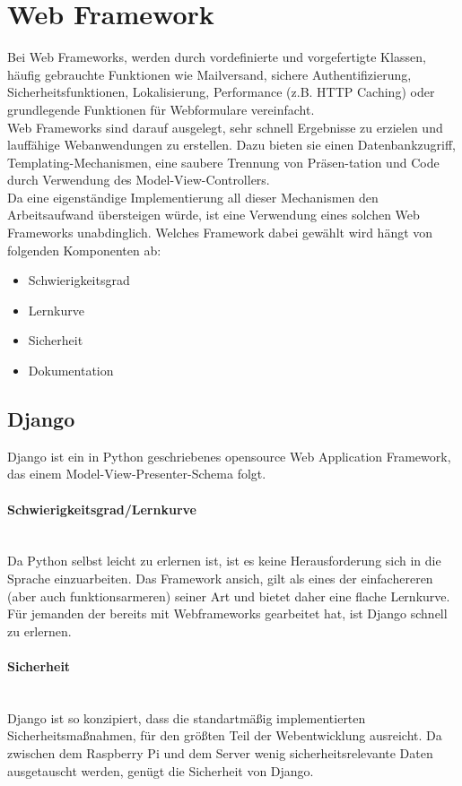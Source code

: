 \documentclass[11pt]{article}
\begin{document}
\section{Web Framework}
Bei Web Frameworks, werden durch vordefinierte und vorgefertigte Klassen, h\"aufig gebrauchte Funktionen wie Mailversand, sichere Authentifizierung, Sicherheitsfunktionen, Lokalisierung, Performance (z.B. HTTP Caching) oder grundlegende Funktionen f\"ur Webformulare vereinfacht. \\
Web Frameworks sind darauf ausgelegt, sehr schnell Ergebnisse zu erzielen und lauff\"ahige Webanwendungen zu erstellen. Dazu bieten sie einen Datenbankzugriff, Templating-Mechanismen, eine saubere Trennung von Pr\"asen-tation und Code durch Verwendung des Model-View-Controllers. \\
Da eine eigenst\"andige Implementierung all dieser Mechanismen den Arbeitsaufwand \"ubersteigen w\"urde, ist eine Verwendung eines solchen Web Frameworks unabdinglich. Welches Framework dabei gew\"ahlt wird h\"angt von folgenden Komponenten ab:
\begin{itemize}
\item Schwierigkeitsgrad
\item Lernkurve
\item Sicherheit
\item Dokumentation
\end{itemize}
\subsection{Django}
Django ist ein in Python geschriebenes opensource Web Application Framework, das einem Model-View-Presenter-Schema folgt.
\paragraph{Schwierigkeitsgrad/Lernkurve} \mbox{}\\
Da Python selbst leicht zu erlernen ist, ist es keine Herausforderung sich in die Sprache einzuarbeiten. Das Framework ansich, gilt als eines der einfachereren (aber auch funktionsarmeren) seiner Art und bietet daher eine flache Lernkurve. F\"ur jemanden der bereits mit Webframeworks gearbeitet hat, ist Django schnell zu erlernen.
\paragraph{Sicherheit} \mbox{}\\
Django ist so konzipiert, dass die standartm\"a{\ss}ig implementierten Sicherheitsma{\ss}nahmen, f\"ur den gr\"o{\ss}ten Teil der Webentwicklung ausreicht. Da zwischen dem Raspberry Pi und dem Server wenig sicherheitsrelevante Daten ausgetauscht werden, gen\"ugt die Sicherheit von Django.
\end{document}
